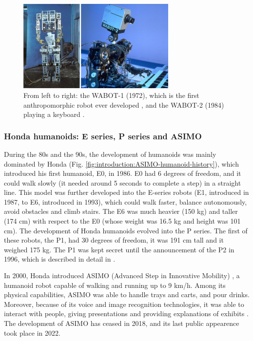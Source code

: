 \begin{figure}
    \centering
    \includegraphics[width=0.7\textwidth]{figures/01-introduction/WABOTs.jpg}
    \caption{From left to right: the WABOT-1 (1972), which is the first anthropomorphic robot
        ever developed \cite{Kato1973TheWABOT1}, and the WABOT-2 (1984)
        playing a keyboard \cite{Kato1987WABOT2}.}
    \label{fig:introduction:WABOTs}
\end{figure}

\subsubsection{Honda humanoids: E series, P series and ASIMO}
During the 80s and the 90s, the development of humanoids was mainly dominated
by Honda (Fig. \ref{fig:introduction:ASIMO-humanoid-history}), which introduced his first humanoid, E0, in 1986. E0 had 6 degrees
of freedom, and it could walk slowly (it needed around 5 seconds to complete 
a step) in a straight line. This model was further developed into the E-series 
robots (E1, introduced in 1987, to E6, introduced in 1993), which could walk 
faster, balance autonomously, avoid obstacles and climb stairs. The E6 was 
much heavier (150 kg) and taller (174 cm) with respect to the E0 (whose 
weight was 16.5 kg and height was 101 cm).
The development of Honda humanoids evolved into the P series. The first of these 
robots, the P1, had 30 degrees of freedom, it
was 191 cm tall and it weighed 175 kg. The P1 was kept secret until the 
announcement of the P2 in 1996, which is described in detail in
\cite{Hirai1998HondaP2}.

In 2000, Honda introduced ASIMO (Advanced Step in Innovative Mobility)
\cite{Sakagami2002ASIMO}, a humanoid robot capable of walking and running 
up to 9 km/h. Among its physical capabilities, ASIMO was able to handle trays 
and carts, and pour drinks. Moreover, because of its voice and image recognition
technologies, it was able to interact with people, giving presentations and 
providing explanations of exhibits \cite{Shigemi2019ASIMOandHumanoidRobotResearchatHonda}.
The development of ASIMO has ceased in 2018, and its last public appearence
took place in 2022.

